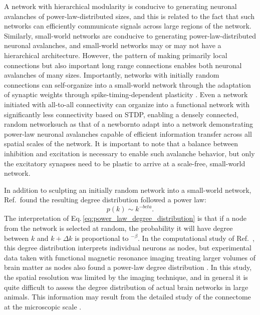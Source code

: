\documentclass[twocolumn]{article}
\newcommand{\onlinecite}[1]{\hspace{-1 ex} \nocite{#1}\citenum{#1}}
\begin{document}
A network with hierarchical modularity is conducive to generating neuronal avalanches of power-law-distributed sizes, and this is related to the fact that such networks can efficiently communicate signals across large regions of the network. Similarly, small-world networks are conducive to generating power-law-distributed neuronal avalanches, and small-world networks may or may not have a hierarchical architecture. However, the pattern of making primarily local connections but also important long range connections enables both neuronal avalanches of many sizes. Importantly, networks with initially random connections can self-organize into a small-world network through the adaptation of synaptic weights through spike-timing-dependent plasticity \cite{shki2006}. Even a network initiated with all-to-all connectivity can organize into a functional network with significantly less connectivity based on STDP, enabling a densely connected, random network\textemdash such as that of a newborn\textemdash to adapt into a network demonstrating power-law neuronal avalanches capable of efficient information transfer across all spatial scales of the network. It is important to note that a balance between inhibition and excitation is necessary to enable such avalanche behavior, but only the excitatory synapses need to be plastic to arrive at a scale-free, small-world network.

In addition to sculpting an initially random network into a small-world network, Ref.\,\onlinecite{shki2006} found the resulting degree distribution followed a power law:
\begin{equation}
\label{eq:power_law_degree_distribution}
p(k) \sim k^{-beta}.
\end{equation}
The interpretation of Eq.\,\ref{eq:power_law_degree_distribution} is that if a node from the network is selected at random, the probability it will have degree between $k$ and $k+\Delta k$ is proportional to $^{-\beta}$. In the computational study of Ref.\,\onlinecite{shki2006}, this degree distribution interprets individual neurons as nodes, but experimental data taken with functional magnetic resonance imaging treating larger volumes of brain matter as nodes also found a power-law degree distribution \cite{egch2005}. In this study, the spatial resolution was limited by the imaging technique, and in general it is quite difficult to assess the degree distribution of actual brain networks in large animals. This information may result from the detailed study of the connectome at the microscopic scale \cite{http://www.humanconnectomeproject.org/}.
   
\end{document}
